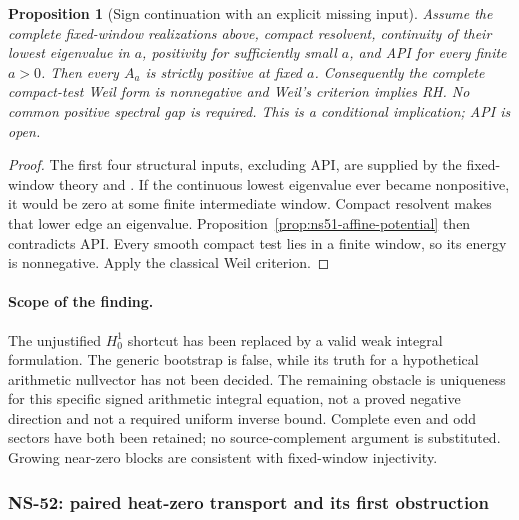 \documentclass[11pt]{article}
\newtheorem{proposition}[theorem]{Proposition}
\theoremstyle{remark}
\begin{document}
\begin{proposition}[Sign continuation with an explicit missing input]
\label{prop:ns51-sign-continuation}
Assume the complete fixed-window realizations above, compact resolvent,
continuity of their lowest eigenvalue in $a$, positivity for sufficiently
small $a$, and API for every finite $a>0$. Then every $A_a$ is strictly
positive at fixed $a$. Consequently the complete compact-test Weil
form is nonnegative and Weil's criterion implies RH. No common positive
spectral gap is required. This is a conditional implication; API is open.
\end{proposition}
\begin{proof}
The first four structural inputs, excluding API, are supplied by the
fixed-window theory and \cite[Theorems 1.3--1.4]{Suzuki2026}.
If the continuous lowest eigenvalue ever became nonpositive, it would
be zero at some finite intermediate window. Compact resolvent makes
that lower edge an eigenvalue. Proposition~\ref{prop:ns51-affine-potential}
then contradicts API. Every smooth compact test lies in a finite window,
so its energy is nonnegative. Apply the classical Weil criterion.
\end{proof}

\paragraph{Scope of the finding.}
The unjustified $H_0^1$ shortcut has been replaced by a valid weak
integral formulation. The generic bootstrap is false, while its truth
for a hypothetical arithmetic nullvector has not been decided. The
remaining obstacle is uniqueness for this specific signed arithmetic
integral equation, not a proved negative direction and not a required
uniform inverse bound. Complete even and odd sectors have both been
retained; no source-complement argument is substituted. Growing
near-zero blocks are consistent with fixed-window injectivity.


\subsubsection{NS-52: paired heat-zero transport and its first obstruction}
\end{document}
